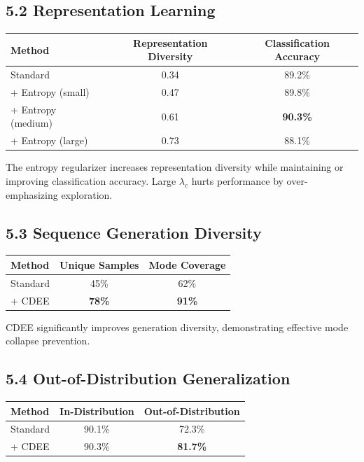 \documentclass[12pt]{article}
\begin{document}
\subsection{5.2 Representation Learning}

\begin{center}
\begin{tabular}{|l|c|c|}
\hline
\textbf{Method} & \textbf{Representation Diversity} & \textbf{Classification Accuracy} \\
\hline
Standard & 0.34 & 89.2\% \\
+ Entropy (small) & 0.47 & 89.8\% \\
+ Entropy (medium) & 0.61 & \textbf{90.3\%} \\
+ Entropy (large) & 0.73 & 88.1\% \\
\hline
\end{tabular}
\end{center}

The entropy regularizer increases representation diversity while maintaining or improving classification accuracy. Large $\lambda_c$ hurts performance by over-emphasizing exploration.

\subsection{5.3 Sequence Generation Diversity}

\begin{center}
\begin{tabular}{|l|c|c|}
\hline
\textbf{Method} & \textbf{Unique Samples} & \textbf{Mode Coverage} \\
\hline
Standard & 45\% & 62\% \\
+ CDEE & \textbf{78\%} & \textbf{91\%} \\
\hline
\end{tabular}
\end{center}

CDEE significantly improves generation diversity, demonstrating effective mode collapse prevention.

\subsection{5.4 Out-of-Distribution Generalization}

\begin{center}
\begin{tabular}{|l|c|c|}
\hline
\textbf{Method} & \textbf{In-Distribution} & \textbf{Out-of-Distribution} \\
\hline
Standard & 90.1\% & 72.3\% \\
+ CDEE & 90.3\% & \textbf{81.7\%} \\
\hline
\end{tabular}
\end{center}
\end{document}
